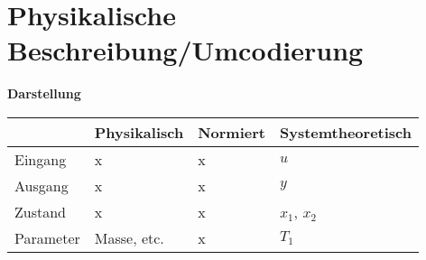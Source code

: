 \section{Physikalische Beschreibung/Umcodierung}


\textbf{Darstellung}


  \begin{tabular}{l| |l|l|l}
    & Physikalisch & Normiert & Systemtheoretisch \\\hline\hline
    Eingang & x & x & $u$ \\
    Ausgang & x & x & $y$ \\
    Zustand & x & x & $x_{1}$, $x_{2}$ \\
    Parameter & Masse, etc. & x & $T_{1}$ \\   %
  \end{tabular}




